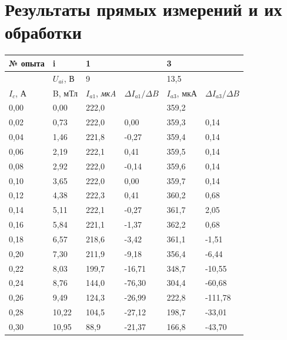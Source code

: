 \documentclass[12pt]{article}
\begin{document}
\section{Результаты прямых измерений и их обработки}
\begin{table}[h!]
    \centering
    \begin{tabular}{|l|l|l|l|l|l|}
    \hline
        № опыта & i & \multicolumn{2}{l|}{1} & \multicolumn{2}{l|}{3} \\ \hline
        ~ & $U_{ai}$, $\textit{В}$ & \multicolumn{2}{l|}{9} & \multicolumn{2}{l|}{13,5}  \\ \hline
        $I_c$, $\textit{А}$ & B, $\textit{мТл}$ & $I_{a1}$, \textit{мкA} & $\Delta{I_{a1}}/\Delta{B}$ & $I_{a3}$, $\textit{мкА}$ & $\Delta{I_{a3}}/\Delta{B}$  \\ \hline
        0,00 & 0,00 & 222,0 & ~ & 359,2 & ~ \\ \hline
        0,02 & 0,73 & 222,0 & 0,00 & 359,3 & 0,14 \\ \hline
        0,04 & 1,46 & 221,8 & -0,27 & 359,4 & 0,14 \\ \hline
        0,06 & 2,19 & 222,1 & 0,41 & 359,5 & 0,14 \\ \hline
        0,08 & 2,92 & 222,0 & -0,14 & 359,6 & 0,14 \\ \hline
        0,10 & 3,65 & 222,0 & 0,00 & 359,7 & 0,14 \\ \hline
        0,12 & 4,38 & 222,3 & 0,41 & 360,2 & 0,68 \\ \hline
        0,14 & 5,11 & 222,1 & -0,27 & 361,7 & 2,05 \\ \hline
        0,16 & 5,84 & 221,1 & -1,37 & 362,2 & 0,68 \\ \hline
        0,18 & 6,57 & 218,6 & -3,42 & 361,1 & -1,51 \\ \hline
        0,20 & 7,30 & 211,9 & -9,18 & 356,4 & -6,44 \\ \hline
        \cellcolor{Gray} 0,22 & 8,03 & 199,7 & -16,71 & 348,7 & -10,55 \\ \hline
        \cellcolor{Gray} 0,24 & 8,76 & 144,0 & \cellcolor{Gray} -76,30 & 304,4 & -60,68 \\ \hline
        \cellcolor{Gray} 0,26 & 9,49 & 124,3 & -26,99 & 222,8 & \cellcolor{Gray} -111,78 \\ \hline
        0,28 & 10,22 & 104,5 & -27,12 & 198,7 & -33,01 \\ \hline
        0,30 & 10,95 & 88,9 & -21,37 & 166,8 & -43,70 \\ \hline

\end{tabular}
\end{table}
\end{document}
